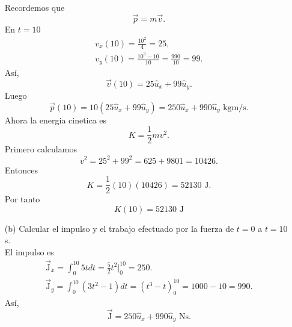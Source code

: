 \documentclass[12pt,a4paper]{article}
\begin{document}
\begin{solucion}
\begin{enumerate}
            Recordemos que
            \begin{equation*}
                \vec{p}=m\vec{v}.
            \end{equation*}
            En $t=10$
            \begin{gather*}
                v_{x}(10)=\frac{10^{2}}{4}=25,\\
                v_{y}(10)=\frac{10^{3}-10}{10}=\frac{990}{10}=99.
            \end{gather*}
            Así, 
            \begin{equation*}
                \vec{v}(10)=25\hat{u}_{x}+99\hat{u}_{y}.
            \end{equation*}
            Luego
            \begin{equation*}
                \vec{p}(10)=10(25\hat{u}_{x}+99\hat{u}_{y})=250\hat{u}_{x}+990\hat{u}_{y}\text{ kgm/s}.
            \end{equation*}
            Ahora la energia cinetica es
            \begin{equation*}
                K=\frac{1}{2}mv^{2}.
            \end{equation*}
            Primero calculamos
            \begin{equation*}
                v^{2}=25^{2}+99^{2}=625+9801=10426.
            \end{equation*}
            Entonces
            \begin{equation*}
                K=\frac{1}{2}(10)(10426)=52130\text{ J}.
            \end{equation*}
            Por tanto
            \begin{equation*}
                K(10)=52130\text{ J}
            \end{equation*}
            \item[(b)] Calcular el impulso y el trabajo efectuado por la fuerza de $t=0$ a $t=10$s.\\
            El impulso es
            \begin{gather*}
                \vec{\text{J}}_{x}=\int_{0}^{10}5tdt=\frac{5}{2}t^{2}\bigg|_{0}^{10}=250.\\
                \vec{\text{J}}_{y}=\int_{0}^{10}(3t^{2}-1)dt=(t^{3}-t)_{0}^{10}=1000-10=990.
            \end{gather*}
            Así,
            \begin{equation*}
                \vec{\text{J}}=250\hat{u}_{x}+990\hat{u}_{y}\text{ Ns}.
            \end{equation*}

\end{enumerate}
\end{solucion}
\end{document}
